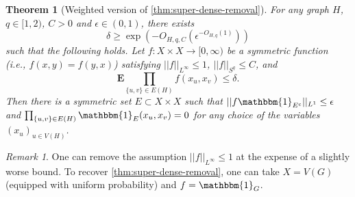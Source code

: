 \documentclass[reqno,11pt]{amsart}
\newtheorem{theorem}{Theorem}[section]
\theoremstyle{definition}
\theoremstyle{remark}
\newtheorem*{remark}{Remark}
\numberwithin{equation}{section}
\newcommand{\E}{\mathbf{E}}
\newcommand{\one}{\mathbbm{1}}
\begin{document}
\begin{theorem}[Weighted version of \cref{thm:super-dense-removal}]
For any graph $H$, $q \in [1, 2)$, $C > 0$ and $\epsilon \in (0, 1)$, there exists
\[
    \delta \ge \exp \left( - O_{H,q,C}\left( \epsilon^{-O_{H,q}(1)}\right) \right)
\] 
such that the following holds. Let $f : X \times X \to [0, \infty)$ be a symmetric function (i.e., $f(x, y) = f(y, x)$) satisfying $||f||_{L^\infty} \le 1$, $||f||_{S^q} \le C$, and
\begin{equation} \label{eq:weighted-H-count}
    \E \prod_{\{u, v\} \in E(H)} f(x_u, x_v) \le \delta.
\end{equation}
Then there is a symmetric set $E \subset X \times X$ such that $||f \one_{E^c}||_{L^1} \le \epsilon$ and $\prod_{\{u, v\} \in E(H)} \one_E(x_u, x_v) = 0$ for any choice of the variables $(x_u)_{u \in V(H)}$.
\end{theorem}

\begin{remark}
One can remove the assumption $||f||_{L^\infty} \le 1$ at the expense of a slightly worse bound. To recover \cref{thm:super-dense-removal}, one can take $X = V(G)$ (equipped with uniform probability) and $f = \one_G$.
\end{remark}
\end{document}
